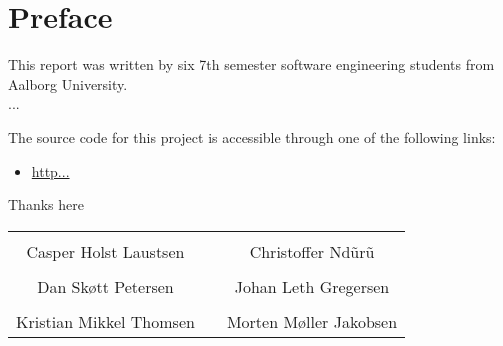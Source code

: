 \thispagestyle{empty}
\section*{Preface}
This report was written by six 7th semester software engineering students from Aalborg University.\\

...

\noindent The source code for this project is accessible through one of the following links:
\begin{itemize}
\item \url{http...}
\end{itemize}

\vspace{.2cm}
\noindent Thanks here

\begin{table}[H]
	\centering
	\vspace{2cm}
		\begin{tabular}{c c c}
			\underline{\phantom{JAERJAERJAERJAERGO}} & \phantom{cookies} & \underline{\phantom{JAERJAERJAERJAERGO}} \\
			Casper Holst Laustsen & \phantom{cookies} & Christoffer Ndũrũ\\[1.5cm]
		    \underline{\phantom{JAERJAERJAERJAERGO}} & \phantom{cookies} & \underline{\phantom{JAERJAERJAERJAERGO}} \\
			Dan Skøtt Petersen & \phantom{cookies} & Johan Leth Gregersen\\[1.5cm]
			\underline{\phantom{JAERJAERJAERJAERGO}} & \phantom{cookies} & \underline{\phantom{JAERJAERJAERJAERGO}} \\ 
			Kristian Mikkel Thomsen & \phantom{cookies} & Morten Møller Jakobsen\\[.5cm]				
		\end{tabular}
\end{table}


